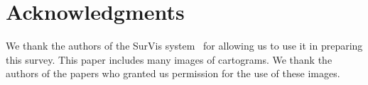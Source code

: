 \documentclass{egpubl}
\begin{document}
\section*{Acknowledgments}
We thank the authors of the SurVis system~\cite{beck2016visual} for allowing us to use it in preparing this survey.
This paper includes many images of cartograms. We thank the authors of the papers who granted us permission for the use of these images.




















\begin{comment}
\section*{References}

List all bibliographical references in 9-point Times, single-spaced, at the
end of your paper in alphabetical order. When referenced in the text, enclose
the citation index in square brackets, for example~\cite{Lous90}. Where
appropriate, include the name(s) of editors of referenced books.

For your references please use the following algorithm:
\begin{itemize} 
\item \textbf{one} author: first 3 chars plus year -- 
      e.g.\ \cite{Lous90}
\item \textbf{two}, \textbf{three} or \textbf{four} authors: first char
      of each family name plus year --  e.g.\ \cite{Fellner-Helmberg93} 
      or \cite{Kobbelt97-USHDR} or \cite{Lafortune97-NARF}
\item \textbf{more than 4} authors: first char of family name from 
      first 3 authors followed by a '*' followed by the year -- 
      e.g.\ \cite{Buhmann:1998:DCQ} or \cite{FolDamFeiHug.etal93} 
\end{itemize}

For BibTeX users a style file \ \texttt{eg-alpha.bst} \ is available which
uses the above algorithm.
\end{comment}
\end{document}
